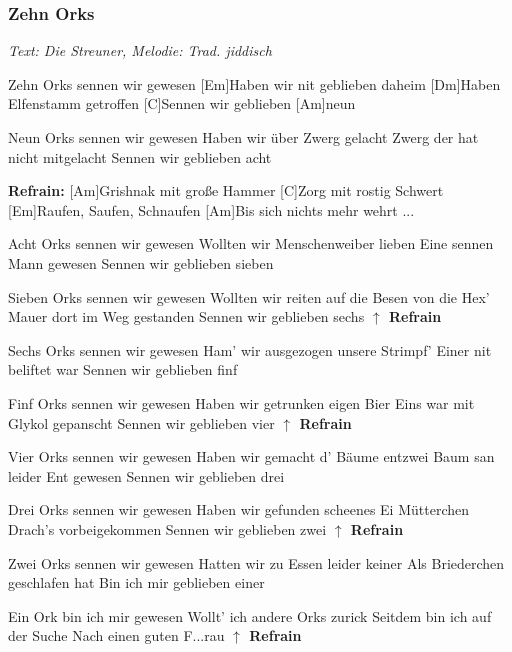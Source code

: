 \documentclass[a5paper,pagesize,twoside,10pt,headings=small]{scrartcl}
\newcommand\songheader[3][]{%
    \subsubsection*{\centering #2}\vspace{0.5\baselineskip}%
    \addcontentsline{toc}{subsection}{#2}
    \centering \textit{#3}\\%
    \vspace{\baselineskip}\par%
}
\newenvironment{myguitar}{\begin{guitar}}{\clearpage\end{guitar}}
\newcommand\Definepart[1]{\textbf{#1}\xspace}
\newcommand\Repeatpart[1]{\textbf{\ensuremath{\uparrow} #1}\vspace{-1.0\baselineskip}\xspace}
\newcommand\Refrain{\Repeatpart{Refrain}}
\newcommand\Refraindef{\Definepart{Refrain:}}
\begin{document}
\songheader{Zehn Orks}{Text: Die Streuner, Melodie: Trad. jiddisch}
\begin{multicols*}{2}
\begin{myguitar}
[Am]Zehn Orks sennen wir gewesen
[Em]Haben wir nit geblieben daheim
[Dm]Haben Elfenstamm getroffen
[C]Sennen wir geblieben [Am]neun

Neun Orks sennen wir gewesen
Haben wir über Zwerg gelacht
Zwerg der hat nicht mitgelacht
Sennen wir geblieben acht

\Refraindef
[Am]Grishnak mit große Hammer
[C]Zorg mit rostig Schwert
[Em]Raufen, Saufen, Schnaufen
[Am]Bis sich nichts mehr wehrt ...

Acht Orks sennen wir gewesen
Wollten wir Menschenweiber lieben
Eine sennen Mann gewesen
Sennen wir geblieben sieben

Sieben Orks sennen wir gewesen
Wollten wir reiten auf die Besen von die Hex'
Mauer dort im Weg gestanden
Sennen wir geblieben sechs
\Refrain

\columnbreak

Sechs Orks sennen wir gewesen
Ham' wir ausgezogen unsere Strimpf'
Einer nit beliftet war
Sennen wir geblieben finf

Finf Orks sennen wir gewesen
Haben wir getrunken eigen Bier
Eins war mit Glykol gepanscht
Sennen wir geblieben vier
\Refrain

Vier Orks sennen wir gewesen
Haben wir gemacht d' Bäume entzwei
Baum san leider Ent gewesen
Sennen wir geblieben drei

Drei Orks sennen wir gewesen
Haben wir gefunden scheenes Ei
Mütterchen Drach's vorbeigekommen
Sennen wir geblieben zwei
\Refrain

Zwei Orks sennen wir gewesen
Hatten wir zu Essen leider keiner
Als Briederchen geschlafen hat
Bin ich mir geblieben einer

Ein Ork bin ich mir gewesen
Wollt' ich andere Orks zurick
Seitdem bin ich auf der Suche
Nach einen guten F...rau
\Refrain
\end{myguitar}
\end{multicols*}
\end{document}
